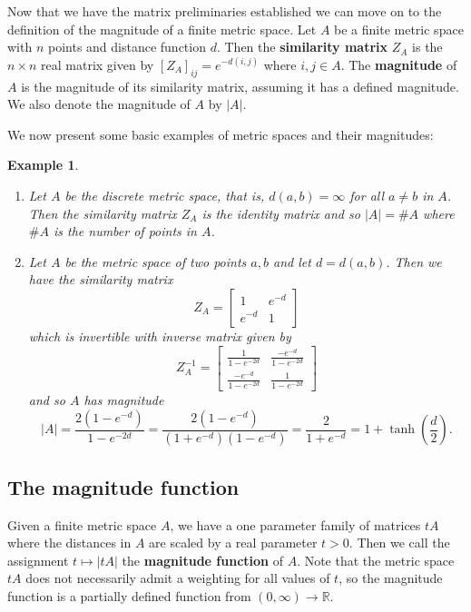 \documentclass[11pt]{article}
\theoremstyle{mythm}
\newtheorem{ex}[defn]{Example}
\begin{document}
Now that we have the matrix preliminaries established we can move on to the definition of the magnitude of a finite metric space. Let $A$ be a finite metric space with $n$ points and distance function $d$. Then the \textbf{similarity matrix} $Z_A$ is the $n\times n$ real matrix given by $[Z_A]_{ij} = e^{-d(i,j)}$ where $i,j \in A$. The \textbf{magnitude} of $A$ is the magnitude of its similarity matrix, assuming it has a defined magnitude. We also denote the magnitude of $A$ by $\vert A\vert$.

We now present some basic examples of metric spaces and their magnitudes:

\begin{ex}
\begin{enumerate}
\item Let $A$ be the discrete metric space, that is, $d(a,b) = \infty$ for all $a \neq b$ in $A$. Then the similarity matrix $Z_A$ is the identity matrix and so $\vert A \vert = \#A$ where $\#A$ is the number of points in $A$.
\item Let $A$ be the metric space of two points $a,b$ and let $d = d(a,b)$. Then we have the similarity matrix
\begin{equation*}
Z_A = \begin{bmatrix} 1 & e^{-d} \\ e^{-d} & 1 \end{bmatrix}
\end{equation*}
which is invertible with inverse matrix given by
\begin{equation*}
Z_A^{-1} = \begin{bmatrix} \frac{1}{1-e^{-2d}} & \frac{-e^{-d}}{1-e^{-2d}} \\ \frac{-e^{-d}}{1-e^{-2d}} & \frac{1}{1-e^{-2d}} \end{bmatrix}
\end{equation*}
and so $A$ has magnitude
\begin{equation*}
\vert A \vert = \frac{2(1-e^{-d})}{1-e^{-2d}} = \frac{2(1-e^{-d})}{(1+e^{-d})(1-e^{-d})} = \frac{2}{1+e^{-d}} = 1+\tanh{\left(\frac{d}{2}\right)}.
\end{equation*}
\end{enumerate}
\end{ex}

\subsection{The magnitude function}

Given a finite metric space $A$, we have a one parameter family of matrices $tA$ where the distances in $A$ are scaled by a real parameter $t > 0$. Then we call the assignment $t\mapsto\vert tA \vert$ the \textbf{magnitude function} of $A$. Note that the metric space $tA$ does not necessarily admit a weighting for all values of $t$, so the magnitude function is a partially defined function from $(0,\infty)\to\mathbb{R}$.
\end{document}
